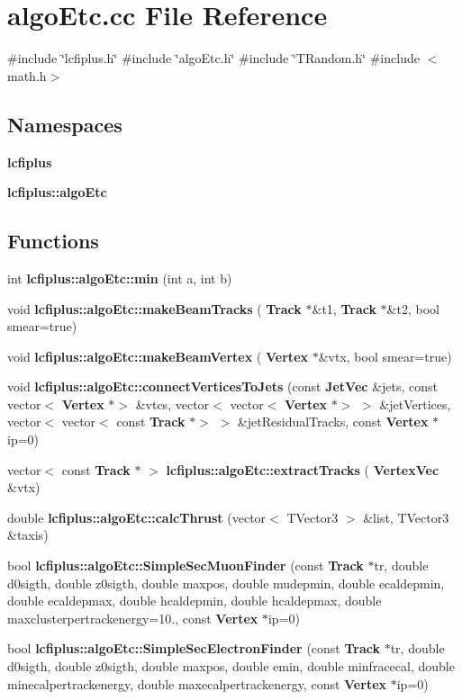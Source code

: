 \section{algo\+Etc.\+cc File Reference}
\label{algoEtc_8cc}
{\ttfamily \#include \char`\"{}lcfiplus.\+h\char`\"{}}\newline
{\ttfamily \#include \char`\"{}algo\+Etc.\+h\char`\"{}}\newline
{\ttfamily \#include \char`\"{}T\+Random.\+h\char`\"{}}\newline
{\ttfamily \#include $<$math.\+h$>$}\newline
\subsection*{Namespaces}
\begin{DoxyCompactItemize}
\item 
 \textbf{ lcfiplus}
\item 
 \textbf{ lcfiplus\+::algo\+Etc}
\end{DoxyCompactItemize}
\subsection*{Functions}
\begin{DoxyCompactItemize}
\item 
int \textbf{ lcfiplus\+::algo\+Etc\+::min} (int a, int b)
\item 
void \textbf{ lcfiplus\+::algo\+Etc\+::make\+Beam\+Tracks} (\textbf{ Track} $\ast$\&t1, \textbf{ Track} $\ast$\&t2, bool smear=true)
\item 
void \textbf{ lcfiplus\+::algo\+Etc\+::make\+Beam\+Vertex} (\textbf{ Vertex} $\ast$\&vtx, bool smear=true)
\item 
void \textbf{ lcfiplus\+::algo\+Etc\+::connect\+Vertices\+To\+Jets} (const \textbf{ Jet\+Vec} \&jets, const vector$<$ \textbf{ Vertex} $\ast$$>$ \&vtcs, vector$<$ vector$<$ \textbf{ Vertex} $\ast$$>$ $>$ \&jet\+Vertices, vector$<$ vector$<$ const \textbf{ Track} $\ast$$>$ $>$ \&jet\+Residual\+Tracks, const \textbf{ Vertex} $\ast$ip=0)
\item 
vector$<$ const \textbf{ Track} $\ast$ $>$ \textbf{ lcfiplus\+::algo\+Etc\+::extract\+Tracks} (\textbf{ Vertex\+Vec} \&vtx)
\item 
double \textbf{ lcfiplus\+::algo\+Etc\+::calc\+Thrust} (vector$<$ T\+Vector3 $>$ \&list, T\+Vector3 \&taxis)
\item 
bool \textbf{ lcfiplus\+::algo\+Etc\+::\+Simple\+Sec\+Muon\+Finder} (const \textbf{ Track} $\ast$tr, double d0sigth, double z0sigth, double maxpos, double mudepmin, double ecaldepmin, double ecaldepmax, double hcaldepmin, double hcaldepmax, double maxclusterpertrackenergy=10., const \textbf{ Vertex} $\ast$ip=0)
\item 
bool \textbf{ lcfiplus\+::algo\+Etc\+::\+Simple\+Sec\+Electron\+Finder} (const \textbf{ Track} $\ast$tr, double d0sigth, double z0sigth, double maxpos, double emin, double minfracecal, double minecalpertrackenergy, double maxecalpertrackenergy, const \textbf{ Vertex} $\ast$ip=0)
\end{DoxyCompactItemize}

